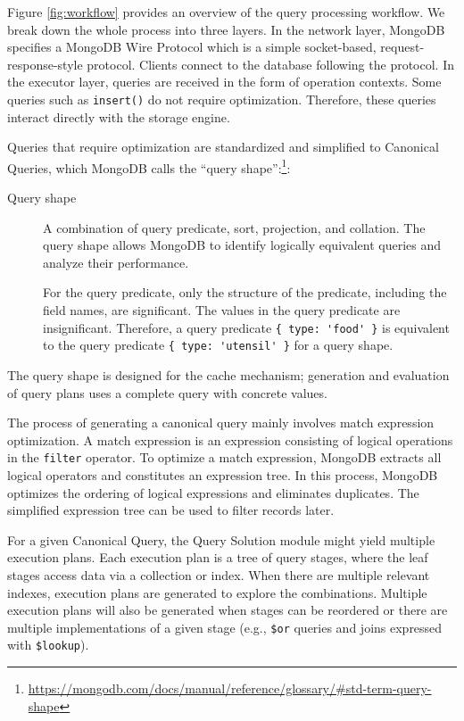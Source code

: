 Figure \ref{fig:workflow} provides an overview of the query processing workflow. We break down the whole process into three layers. In the network layer, MongoDB specifies a MongoDB Wire Protocol which is a simple socket-based, request-response-style protocol. Clients connect to the database following the protocol. In the executor layer, queries are received in the form of operation contexts. Some queries such as \verb|insert()| do not require optimization. Therefore, these queries interact directly with the storage engine.

Queries that require optimization are standardized and simplified to Canonical Queries, which MongoDB calls the ``query shape'':\footnote{\url{https://mongodb.com/docs/manual/reference/glossary/\#std-term-query-shape}}:
\begin{description}
\item[Query shape] A combination of query predicate, sort, projection, and collation. The query shape allows MongoDB to identify logically equivalent queries and analyze their performance.

For the query predicate, only the structure of the predicate, including the field names, are significant. The values in the query predicate are insignificant. Therefore, a query predicate \verb|{ type: 'food' }| is equivalent to the query predicate \verb|{ type: 'utensil' }| for a query shape.
\end{description}

The query shape is designed for the cache mechanism; generation and evaluation of query plans uses a complete query with concrete values. 

The process of generating a canonical query mainly involves match expression optimization. A match expression is an expression consisting of logical operations in the \verb|filter| operator. To optimize a match expression, MongoDB extracts all logical operators and constitutes an expression tree.  In this process, MongoDB optimizes the ordering of logical expressions and eliminates duplicates. The simplified expression tree can be used to filter records later. 

For a given Canonical Query, the Query Solution module might yield multiple execution plans. Each execution plan is a tree of query stages, where the leaf stages access data via a collection or index. When there are multiple relevant indexes, execution plans are generated to explore the combinations. Multiple execution plans will also be generated when stages can be reordered or there are multiple implementations of a given stage (e.g., \verb|$or| queries and joins expressed with \verb|$lookup|).


